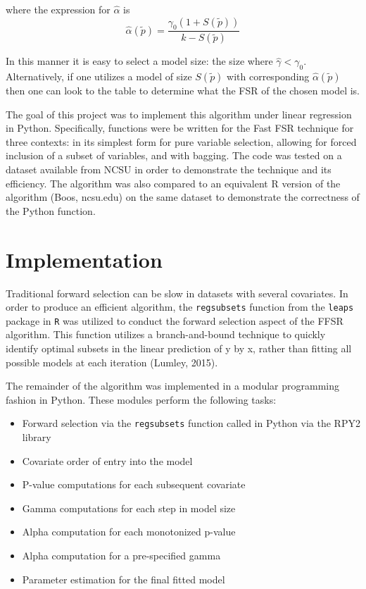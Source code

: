 \documentclass[12pt]{article}
\begin{document}
where the expression for $\hat{\alpha}$ is
$$ \hat{\alpha}(\tilde{p}) = \frac{\gamma_0(1+S(\tilde{p}))}{k - S(\tilde{p})}$$

In this manner it is easy to select a model size: the size where $\hat{\gamma} < \gamma_0$.  Alternatively, if one utilizes 
a model of size $S(\tilde{p})$ with corresponding $\hat{\alpha}(\tilde{p})$ then one can look to the table to determine 
what the FSR of the chosen model is.

The goal of this project was to implement this algorithm under linear regression in Python. Specifically, functions were be 
written for the Fast FSR technique for three contexts: in its simplest form for pure variable selection, allowing for forced 
inclusion of a subset of variables, and with bagging. The code was tested on a 
dataset available from NCSU in order to demonstrate the technique 
and its efficiency. The algorithm was also compared to an equivalent R version of the algorithm (Boos, ncsu.edu) on the same 
dataset to demonstrate the correctness of the Python function.


\section{Implementation}
Traditional forward selection can be slow in datasets with several covariates.  In order to produce an efficient algorithm, the 
\texttt{regsubsets} function from the \texttt{leaps} package in \texttt{R} was utilized to conduct the forward selection 
aspect of the FFSR algorithm.  This function utilizes a branch-and-bound technique to quickly identify optimal subsets in 
the linear prediction of y by x, rather than fitting all possible models at each iteration (Lumley, 2015).

The remainder of the algorithm was implemented in a modular programming fashion in Python.  These modules perform the 
following tasks:
\begin{itemize}
	\item Forward selection via the \texttt{regsubsets} function called in Python via the RPY2 library
	\item Covariate order of entry into the model
	\item P-value computations for each subsequent covariate
	\item Gamma computations for each step in model size
	\item Alpha computation for each monotonized p-value
	\item Alpha computation for a pre-specified gamma
	\item Parameter estimation for the final fitted model
\end{itemize}
\end{document}
